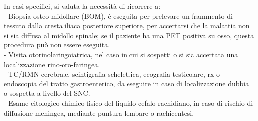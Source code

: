 In casi specifici, si valuta la necessità di ricorrere a:\\ 
- Biopsia osteo-midollare (BOM), è eseguita per prelevare un frammento di tessuto dalla cresta iliaca posteriore 
superiore, per accertarsi che la malattia non si sia diffusa al midollo spinale; se il paziente ha una PET positiva 
su osso, questa procedura può non essere eseguita.\\
- Visita otorinolaringoiatrica, nel caso in cui si sospetti o si sia accertata una localizzazione rino-oro-faringea.\\
- TC/RMN cerebrale, scintigrafia scheletrica, ecografia testicolare, rx o endoscopia del tratto gastroenterico, 
da eseguire in caso di localizzazione dubbia o sospetta a livello del SNC.\\
- Esame citologico chimico-fisico del liquido cefalo-rachidiano, in caso di rischio di diffusione meningea, 
mediante puntura lombare o rachicentesi\cite{AIOM}.\\






